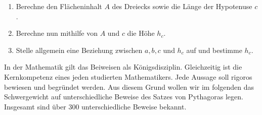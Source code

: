 \documentclass[11pt,oneside]{article}
\begin{document}
\begin{aufgabe}
\begin{enumerate}
\begin{enumerate}[label=\alph*)]
				\item Berechne den Flächeninhalt $A$ des Dreiecks sowie die Länge der Hypotenuse $c$.
				\item Berechne nun mithilfe von $A$ und $c$ die Höhe $h_c$.
				\item Stelle allgemein eine Beziehung zwischen $a,b,c$ und $h_c$ auf und bestimme $h_c$.
			\end{enumerate}
		\end{enumerate}
	\end{aufgabe}
	In der Mathematik gilt das Beiweisen als Königsdisziplin. Gleichzeitig ist die Kernkompetenz eines jeden studierten Mathematikers. Jede Aussage soll rigoros bewiesen und begründet werden. Aus diesem Grund wollen wir im folgenden das Schwergewicht auf unterschiedliche Beweise des Satzes von Pythagoras legen. Insgesamt sind über 300 unterschiedliche Beweise bekannt.
\end{document}
